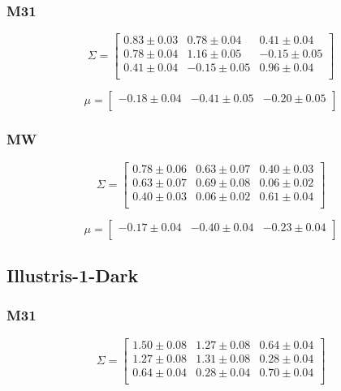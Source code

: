\documentclass[a4paper,fleqn,usenatbib]{mnras}
\begin{document}
\subsubsection{M31}

\[
\Sigma= 
\begin{bmatrix}
0.83\pm 0.03  & 0.78\pm 0.04  & 0.41\pm 0.04\\
0.78\pm 0.04  & 1.16\pm 0.05 & -0.15\pm 0.05\\
0.41\pm 0.04 & -0.15\pm 0.05 & 0.96\pm 0.04\\
\end{bmatrix}
\]

\[
\mu= 
\begin{bmatrix}
-0.18\pm 0.04 & -0.41\pm 0.05 & -0.20\pm 0.05\\
\end{bmatrix}
\]

\subsubsection{MW}

\[
\Sigma= 
\begin{bmatrix}
 0.78\pm 0.06 & 0.63 \pm 0.07  & 0.40 \pm 0.03\\
  0.63\pm 0.07 & 0.69 \pm 0.08 &  0.06 \pm 0.02\\
  0.40\pm 0.03 & 0.06 \pm 0.02 &  0.61\pm 0.04\\
\end{bmatrix}
\]

\[
\mu= 
\begin{bmatrix}
-0.17\pm 0.04 & -0.40\pm 0.04 & -0.23\pm 0.04\\
\end{bmatrix}
\]

\subsection{Illustris-1-Dark}

\subsubsection{M31}

\[
\Sigma= 
\begin{bmatrix}
 1.50\pm 0.08 & 1.27\pm 0.08 & 0.64\pm 0.04\\
  1.27\pm 0.08 &  1.31\pm 0.08&  0.28\pm 0.04\\
  0.64\pm 0.04 &  0.28\pm 0.04 & 0.70\pm 0.04\\
\end{bmatrix}
\]
\end{document}
